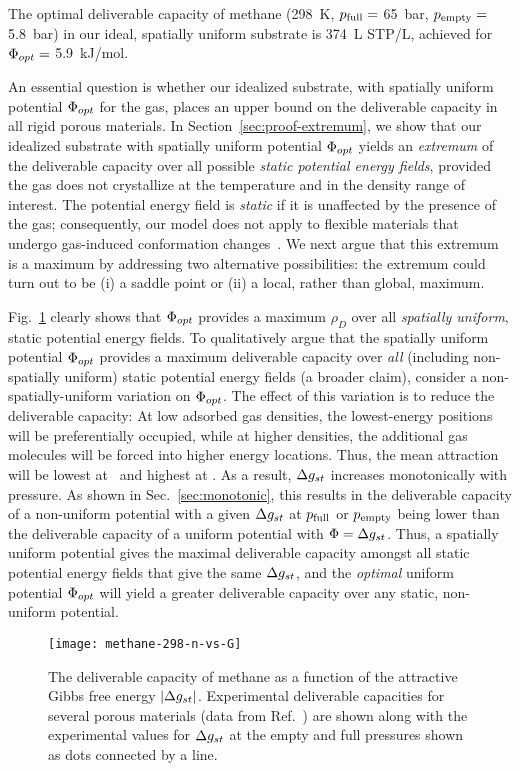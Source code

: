 The optimal deliverable capacity of methane (298\ K, $p_{\text{full}}=$ 65\ bar,
$p_{\text{empty}}=$ 5.8\ bar) in our ideal, spatially uniform substrate is 374\ L STP/L,
achieved for $\Phi_{opt} =$ 5.9\ kJ/mol.

An essential question is whether our idealized substrate, with spatially
uniform potential $\Phi_{opt}$ for the gas, places an upper bound on the
deliverable capacity in all rigid porous materials. In
Section~\ref{sec:proof-extremum}, we show that our idealized substrate with
spatially uniform potential $\Phi_{opt}$ yields an \emph{extremum} of the
deliverable capacity over all possible \emph{static potential energy fields},
provided the gas does not crystallize at the temperature and in the density
range of interest. The potential energy field is \emph{static} if it is
unaffected by the presence of the gas; consequently, our model does not apply
to flexible materials that undergo gas-induced conformation
changes~\cite{schneemann2014flexible}. We next argue that this extremum is a
maximum by addressing two alternative possibilities: the extremum could turn
out to be (i) a saddle point or (ii) a local, rather than global, maximum.

Fig.~\ref{fig:methane-298-D} clearly shows that $\Phi_{opt}$ provides a maximum
$\rho_D$ over all \emph{spatially uniform}, static potential energy fields. To
qualitatively argue that the spatially uniform potential $\Phi_{opt}$ provides a
maximum deliverable capacity over \emph{all} (including non-spatially uniform)
static potential energy fields (a broader claim), consider a
non-spatially-uniform variation on $\Phi_{opt}$. The effect of
this variation is to reduce the deliverable capacity: At low adsorbed gas
densities, the lowest-energy positions will be preferentially occupied, while
at higher densities, the additional gas molecules will be forced into higher
energy locations. Thus, the mean attraction will be lowest at \pfull\ and
highest at \pempty. As a result, $\Delta g_{st}$ increases monotonically with
pressure. As shown in Sec.~\ref{sec:monotonic}, this results in
the deliverable capacity of a non-uniform potential with a given $\Delta g_{st}$ at $p_{\text{full}}$ or $p_{\text{empty}}$ being lower than the
deliverable capacity of a uniform potential with $\Phi=\Delta g_{st}$. Thus, a spatially uniform potential gives the maximal
deliverable capacity amongst all static potential energy fields that give the
same $\Delta g_{st}$, and the \emph{optimal} uniform potential $\Phi_{opt}$ will yield a
greater deliverable capacity over any static, non-uniform potential.

\begin{figure}
    \centering
    \texttt{[image: methane-298-n-vs-G]}
    \caption{The deliverable capacity of methane as a function of the attractive Gibbs free energy $|\Delta g_{st}|$.
    Experimental deliverable capacities for several porous materials (data from Ref.~\cite{mason2014evaluating, furukawa2009storage}) are shown along with the experimental values for $\Delta g_{st}$ at the empty and full pressures shown as dots connected by a line.}
    \label{fig:methane-298-D}
\end{figure}

